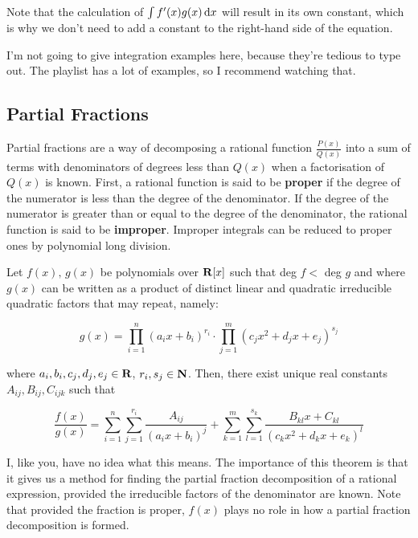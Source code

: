 \documentclass{article}
\begin{document}
  Note that the calculation of \(\int{f'(x)g(x) \, \mathrm{d}x}\) will result in its own constant, which is why we don't need to add a constant to the right-hand side of the equation.

  I'm not going to give integration examples here, because they're tedious to type out. The playlist has a lot of examples, so I recommend watching that.

  \subsection{Partial Fractions}

  Partial fractions are a way of decomposing a rational function \(\frac{P(x)}{Q(x)}\) into a sum of terms with denominators of degrees less than \(Q(x)\) when a factorisation of \(Q(x)\) is known. First, a rational function is said to be \textbf{proper} if the degree of the numerator is less than the degree of the denominator. If the degree of the numerator is greater than or equal to the degree of the denominator, the rational function is said to be \textbf{improper}. Improper integrals can be reduced to proper ones by polynomial long division.

  \begin{thm} Let \(f(x), \, g(x)\) be polynomials over \(\mathbf{R} [x]\) such that deg \(f <\) deg \(g\) and where \(g(x)\) can be written as a product of distinct linear and quadratic irreducible quadratic factors that may repeat, namely:

    \[
      g(x) = \prod_{i=1}^{n}{(a_i x + b_i)^{r_i}} \cdot \prod_{j=1}^{m}{(c_j x^2 + d_j x + e_j)^{s_j}}
    \]

    where \(a_i, b_i, c_j, d_j, e_j \in \mathbf{R}\), \(r_i, s_j \in \mathbf{N}\). Then, there exist unique real constants \(A_{ij}, B_{ij}, C_{ijk}\) such that

    \[
      \frac{f(x)}{g(x)} = \sum_{i=1}^{n}{\sum_{j=1}^{r_i}{\frac{A_{ij}}{(a_i x + b_i)^j}}} + \sum_{k=1}^{m}{\sum_{l=1}^{s_k}{\frac{B_{kl}x + C_{kl}}{(c_k x^2 + d_k x + e_k)^l}}}
    \]
  \end{thm}

  I, like you, have no idea what this means. The importance of this theorem is that it gives us a method for finding the partial fraction decomposition of a rational expression, provided the irreducible factors of the denominator are known. Note that provided the fraction is proper, \(f(x)\) plays no role in how a partial fraction decomposition is formed. 
\end{document}
